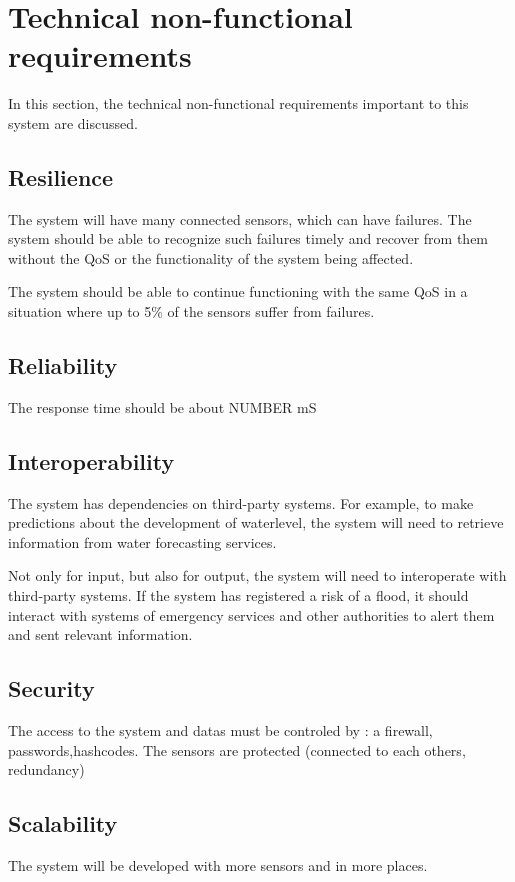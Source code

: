 \section{Technical non-functional requirements}

In this section, the technical non-functional requirements important to this system are discussed.

\subsection{Resilience}
The system will have many connected sensors, which can have failures. The system should be able to recognize such failures timely and recover from them without the QoS or the functionality of the system being affected. 

The system should be able to continue functioning with the same QoS in a situation where up to 5\% of the sensors suffer from failures.  %

\subsection{Reliability}
The response time should be about NUMBER mS

\subsection{Interoperability}
The system has dependencies on third-party systems. For example, to make predictions about the development of waterlevel, the system will need to retrieve information from water forecasting services. 

Not only for input, but also for output, the system will need to interoperate with third-party systems. If the system has registered a risk of a flood, it should interact with systems of emergency services and other authorities to alert them and sent relevant information.

\subsection{Security}
The access to the system and datas must be controled by : a firewall, passwords,hashcodes.
The sensors are protected (connected to each others, redundancy)

\subsection{Scalability}
The system will be developed with more sensors and in more places.

